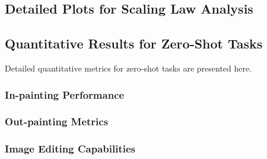\documentclass{article}
\begin{document}
\subsection{Detailed Plots for Scaling Law Analysis}

\subsection{Quantitative Results for Zero-Shot Tasks}
Detailed quantitative metrics for zero-shot tasks are presented here.
\subsubsection{In-painting Performance}

\subsubsection{Out-painting Metrics}

\subsubsection{Image Editing Capabilities}
\end{document}
